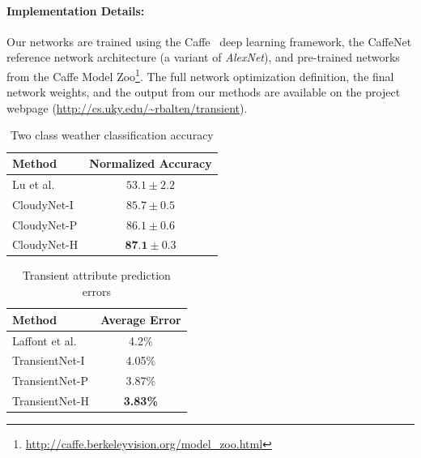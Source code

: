 \documentclass[10pt,twocolumn,letterpaper]{article}
\newcommand{\todo}[1]{\textcolor{red}{todo: {\em #1}}}
\begin{document}
%

\vspace{-1em}
\paragraph{Implementation Details:} Our networks are trained using the
Caffe~\cite{caffe14} deep learning framework, the CaffeNet reference network
architecture (a variant of \emph{AlexNet}), and pre-trained networks from the Caffe
Model Zoo\footnote{\url{http://caffe.berkeleyvision.org/model_zoo.html}}.  The
full network optimization definition, the final network weights, and the output
from our methods are available on the project webpage (\url{http://cs.uky.edu/~rbalten/transient}).


\begin{table}[t]
	\centering
	\caption{Two class weather classification accuracy}
	\begin{tabular}{ | l | c | }
		\hline
			Method & Normalized Accuracy \\ \hline \hline
			Lu et al.~\cite{lutwoclass}& $ 53.1 \pm 2.2 $ \\ \hline
			CloudyNet-I & $ 85.7 \pm 0.5 $ \\ \hline
			CloudyNet-P & $ 86.1 \pm 0.6 $ \\ \hline
			CloudyNet-H & $ \textbf{87.1} \pm 0.3 $ \\ 
		\hline
	\end{tabular}
	\label{tbl:twoclass}
\end{table}

\begin{table}[t]
	\centering
	\caption{Transient attribute prediction errors}
	\begin{tabular}{ | l | c | }
		\hline
			Method & Average Error \\ \hline \hline
			Laffont et al.~\cite{Laffont14}& 4.2\% \\ \hline
			TransientNet-I & 4.05\% \\ \hline
			TransientNet-P & 3.87\% \\ \hline
			TransientNet-H & \textbf{3.83\%} \\ 
		\hline
	\end{tabular}
	\label{tbl:transient}
\end{table}
\end{document}

